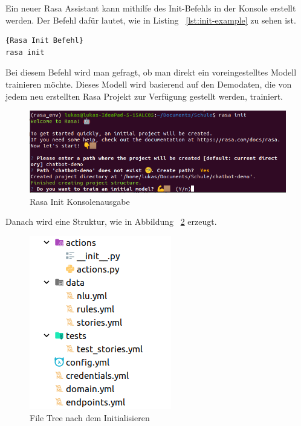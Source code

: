 Ein neuer Rasa Assistant kann mithilfe des Init-Befehls in der Konsole erstellt werden.
Der Befehl dafür lautet, wie in Listing ~\ref{lst:init-example} zu sehen ist.

\begin{lstlisting}[language=bash,label={lst:init-example},caption={Befehl fürs Initialisieren}]{Rasa Init Befehl}
rasa init
\end{lstlisting}

Bei diesem Befehl wird man gefragt, ob man direkt ein voreingestelltes Modell trainieren möchte.
Dieses Modell wird basierend auf den Demodaten, die von jedem neu erstellten Rasa Projekt zur Verfügung gestellt werden, trainiert.

\begin{figure}[hbt!]
    \centering
    \includegraphics[scale=0.5]{pics/rasa_init}
    \caption{Rasa Init Konsolenausgabe}
    \label{fig:rasa_init}
\end{figure}

Danach wird eine Struktur, wie in Abbildung ~\ref{fig:file_tree} erzeugt.

\begin{figure}[hbt!]
    \centering
    \includegraphics[scale=0.75]{pics/rasa_file_tree}
    \caption{File Tree nach dem Initialisieren}
    \label{fig:file_tree}
\end{figure}


